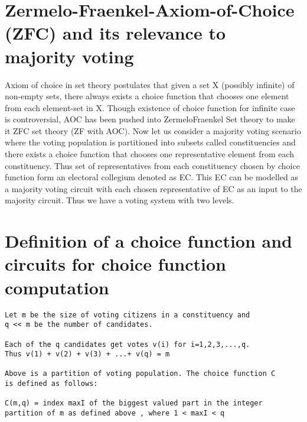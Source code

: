 \documentclass[11pt,onecolumn]{article}
\begin{document}
\section{Zermelo-Fraenkel-Axiom-of-Choice (ZFC) and its relevance to majority voting}
Axiom of choice in set theory postulates that given a set X (possibly infinite) of non-empty sets,
there always exists a choice function that chooses one element from each element-set in X.
Though existence of choice function for infinite case is controversial, AOC has been pushed into
ZermeloFraenkel Set theory to make it ZFC set theory (ZF with AOC). Now let us consider a
majority voting scenario where the voting population is partitioned into subsets called
constituencies and there exists a choice function that chooses one representative element from
each constituency. Thus set of representatives from each constituency chosen by choice function
form an electoral collegium denoted as EC. This EC can be modelled as a majority voting
circuit with each chosen representative of EC as an input to the majority circuit. Thus we have a
voting system with two levels.

\section{Definition of a choice function and circuits for choice function computation}
\begin{verbatim}
Let m be the size of voting citizens in a constituency and 
q << m be the number of candidates.

Each of the q candidates get votes v(i) for i=1,2,3,...,q. 
Thus v(1) + v(2) + v(3) + ...+ v(q) = m

Above is a partition of voting population. The choice function C 
is defined as follows:

C(m,q) = index maxI of the biggest valued part in the integer 
partition of m as defined above , where 1 < maxI < q
\end{verbatim}
\end{document}
